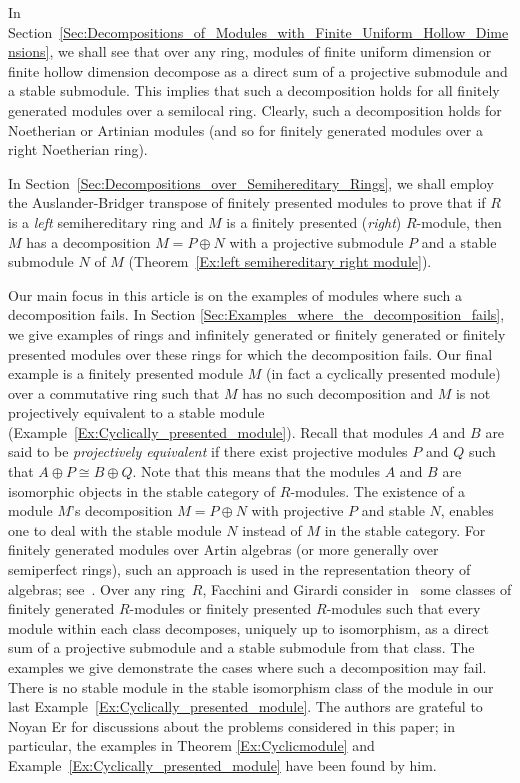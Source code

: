 \documentclass[11pt,a4paper]{amsart}
\theoremstyle{plain}
\theoremstyle{definition}
\theoremstyle{remark}
\begin{document}
In Section~\ref{Sec:Decompositions_of_Modules_with_Finite_Uniform_Hollow_Dimensions}, we shall see that over any ring, modules of finite uniform dimension or finite hollow dimension decompose as a direct sum of a projective submodule and a stable submodule.
This implies that such a decomposition holds for all finitely generated modules over a semilocal ring. Clearly, such a decomposition holds for Noetherian or Artinian modules (and so for finitely generated modules over a right Noetherian ring).

In Section~\ref{Sec:Decompositions_over_Semihereditary_Rings}, we shall employ the Auslander-Bridger transpose of finitely presented modules to prove that if
 $R$ is a \emph{left} semihereditary ring and $M$ is a finitely presented (\emph{right}) $R$-module, then $M$ has a decomposition $M=P\oplus N$ with a projective submodule $P$ and a stable submodule $N$ of $M$ (Theorem~\ref{Ex:left semihereditary right module}). 

Our main focus in this article is on the examples of modules where such a decomposition fails. In Section \ref{Sec:Examples_where_the_decomposition_fails},  we give examples of rings {and infinitely generated or finitely generated or finitely presented modules over these rings for which the decomposition fails}. Our {final example} is a finitely presented module $M$ (in fact a cyclically presented module) over a commutative ring such that $M$ has no such decomposition and $M$ is not projectively equivalent to a stable module (Example~\ref{Ex:Cyclically_presented_module}). {Recall} that modules $A$ and $B$ are said to be \emph{projectively equivalent} if there exist projective modules $P$ and $Q$ such that $A\oplus P \cong B\oplus Q$. Note that this means that the modules $A$ and $B$ are isomorphic objects in the stable category of $ R $-modules. The existence of a module $ M $'s decomposition $ M =P\oplus N$ with projective  $ P $  and stable $ N $, enables one to deal with the stable module $ N $ instead of $ M $ in the stable category. For finitely generated modules over Artin algebras (or more generally over semiperfect rings),  such an approach is used in the representation theory of algebras; see~\cite[p. 104-105]{Auslander-Reiten-Smalo:RepresentationTheoryOfArtinAlgebras}. Over any ring~$R$, Facchini and Girardi consider in~\cite{Facchini-Girardi:AuslanderBridgerModules} some classes of finitely generated $R$-modules or finitely presented $R$-modules such that every module within each class decomposes, uniquely up to isomorphism, as a direct sum of a projective submodule and a stable submodule from that class. The examples we give demonstrate the cases where such a decomposition may fail. There is no stable module in the stable isomorphism class of the module in our last Example~\ref{Ex:Cyclically_presented_module}. The authors are grateful to Noyan Er for discussions about the problems considered in this paper; in particular, the examples in Theorem \ref{Ex:Cyclicmodule} and Example~\ref{Ex:Cyclically_presented_module} have been found by him.
\end{document}

